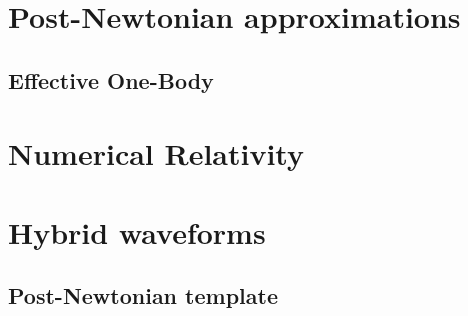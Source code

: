 
\section{Post-{N}ewtonian approximations}
\label{sec:PNWaveforms}

\subsection{Effective One-Body}
\label{ssec:EOB}

\section{Numerical Relativity}
\label{sec:NRWaveforms}

\section{Hybrid waveforms}
\label{sec:HybridWaveforms}


\iffalse

\subsection{Post-{N}ewtonian template}
\label{sec:PNWaveforms}

